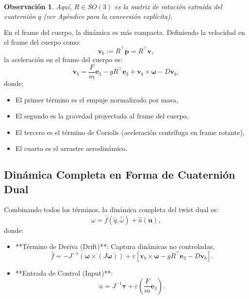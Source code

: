 \documentclass[11pt,a4paper]{article}
\newtheorem{remark}[theorem]{Observación}
\begin{document}
\begin{remark}
Aquí, $R \in SO(3)$ es la matriz de rotación extraída del cuaternión $q$ (ver Apéndice para la conversión explícita).
\end{remark}

En el frame del cuerpo, la dinámica es más compacta. Definiendo la velocidad en el frame del cuerpo como:
\begin{equation}
    \mathbf{v}_b := R^\top \dot{\mathbf{p}} = R^\top \mathbf{v},
\end{equation}
la aceleración en el frame del cuerpo es:
\begin{equation}
    \dot{\mathbf{v}}_b = \frac{F}{m}\mathbf{e}_3 - g R^\top \mathbf{e}_3 + \mathbf{v}_b \times \boldsymbol{\omega} - D \mathbf{v}_b,
    \label{eq:accel_body_frame}
\end{equation}
donde:
\begin{itemize}
    \item El primer término es el empuje normalizado por masa,
    \item El segundo es la gravedad proyectada al frame del cuerpo,
    \item El tercero es el término de Coriolis (aceleración centrífuga en frame rotante),
    \item El cuarto es el arrastre aerodinámico.
\end{itemize}

\subsection{Dinámica Completa en Forma de Cuaternión Dual}

Combinando todos los términos, la dinámica completa del twist dual es:
\begin{equation}
    \dot{\hat{\omega}} = \hat{f}(\hat{q}, \hat{\omega}) + \hat{u}(\mathbf{u}),
    \label{eq:dual_dynamics_complete}
\end{equation}
donde:

\begin{itemize}
    \item **Término de Deriva (Drift)**: Captura dinámicas no controladas,
    \begin{equation}
        \hat{f} = 
        -J^{-1}(\boldsymbol{\omega} \times (J\boldsymbol{\omega}))
        + \varepsilon \left[
            \mathbf{v}_b \times \boldsymbol{\omega}
            - g R^\top \mathbf{e}_3
            - D \mathbf{v}_b
        \right].
    \end{equation}

    \item **Entrada de Control (Input)**:
    \begin{equation}
        \hat{u} = 
        J^{-1}\boldsymbol{\tau}
        + \varepsilon \left(\frac{F}{m}\mathbf{e}_3\right).
    \end{equation}
\end{itemize}
\end{document}
